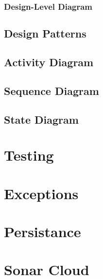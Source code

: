 \documentclass[12pt]{article}
\begin{document}
\subsubsection{Design-Level Diagram}
\subsection{Design Patterns}
\subsection{Activity Diagram}
\subsection{Sequence Diagram}
\subsection{State Diagram}
\section{Testing}
\section{Exceptions}
\section{Persistance}
\section{Sonar Cloud}
\end{document}

